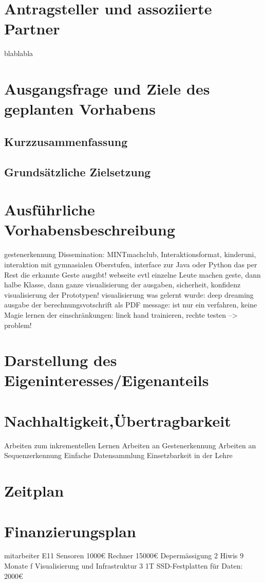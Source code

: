\documentclass{article}
\begin{document}
\renewcommand{\thesection}{2}
\section{Antragsteller und assoziierte Partner}
blablabla

\renewcommand{\thesection}{3}
\section{Ausgangsfrage und Ziele des geplanten Vorhabens}
\subsection{Kurzzusammenfassung}
\subsection{Grundsätzliche Zielsetzung}
%
\renewcommand{\thesection}{4}
\section{Ausführliche Vorhabensbeschreibung}
gestenerkennung
Dissemination: MINTmachclub, Interaktionsformat, kinderuni,
interaktion mit gymnasialen Oberstufen, interface zur Java oder Python das per Rest die erkannte Geste ausgibt!
webseite
evtl einzelne Leute machen geste, dann halbe Klasse, dann ganze
visualisierung der ausgaben, sicherheit, konfidenz
visualisierung der Prototypen!
visualisierung was gelernt wurde: deep dreaming
ausgabe der berechnungsvotschrift als PDF
message: ist nur ein verfahren, keine Magie
lernen der einschränkungen: linek hand trainieren, rechte testen --> problem!


\renewcommand{\thesection}{5}
\section{Darstellung des Eigeninteresses/Eigenanteils}


\renewcommand{\thesection}{6}
\section{Nachhaltigkeit,Übertragbarkeit}
Arbeiten zum inkrementellen Lernen
Arbeiten an Gestenerkennung
Arbeiten an Sequenzerkennung
Einfache Datensammlung
Einsetzbarkeit in der Lehre

\renewcommand{\thesection}{7}
\section{Zeitplan}

\renewcommand{\thesection}{8}
\section{Finanzierungsplan}
mitarbeiter E11
Sensoren 1000€
Rechner 15000€
Depermässigung
2 Hiwis 9 Monate f Visualisierung und Infrastruktur
3 1T SSD-Festplatten für Daten: 2000€


\renewcommand{\refname}{}


%
\end{document}
